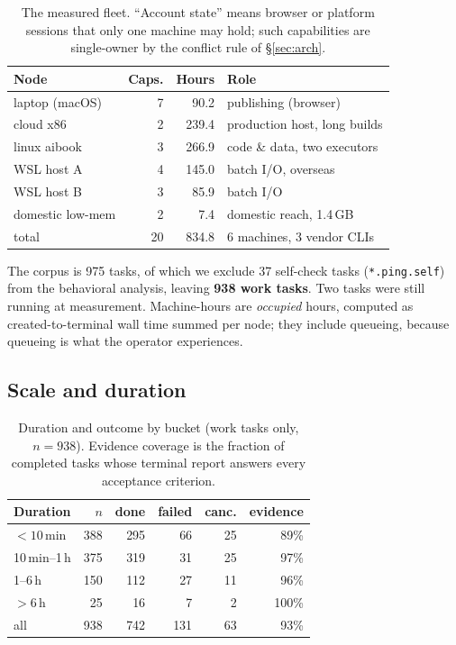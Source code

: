 \documentclass{article}
\begin{document}
\begin{table}[t]
\centering\small
\caption{The measured fleet. ``Account state'' means browser or platform sessions
that only one machine may hold; such capabilities are single-owner by the conflict
rule of \S\ref{sec:arch}.}
\label{tab:fleet}
\setlength{\tabcolsep}{3.2pt}
\begin{tabular}{@{}lrrp{}@{}}
\toprule
Node & Caps. & Hours & Role \\
\midrule
laptop (macOS)   & 7 &  90.2 & publishing (browser) \\
cloud x86        & 2 & 239.4 & production host, long builds \\
linux aibook     & 3 & 266.9 & code \& data, two executors \\
WSL host A       & 4 & 145.0 & batch I/O, overseas \\
WSL host B       & 3 &  85.9 & batch I/O \\
domestic low-mem & 2 &   7.4 & domestic reach, 1.4\,GB \\
\midrule
total            & 20 & 834.8 & 6 machines, 3 vendor CLIs \\
\bottomrule
\end{tabular}
\end{table}

The corpus is 975 tasks, of which we exclude 37 self-check tasks
(\texttt{*.ping.self}) from the behavioral analysis, leaving \textbf{938 work
tasks}. Two tasks were still running at measurement. Machine-hours are
\emph{occupied} hours, computed as created-to-terminal wall time summed per node; they
include queueing, because queueing is what the operator experiences.

\subsection{Scale and duration}

\begin{table}[t]
\centering\small
\caption{Duration and outcome by bucket (work tasks only, $n=938$). Evidence
coverage is the fraction of completed tasks whose terminal report answers every
acceptance criterion.}
\label{tab:dur}
\begin{tabular}{@{}lrrrrr@{}}
\toprule
Duration & $n$ & done & failed & canc. & evidence \\
\midrule
$<10$\,min   & 388 & 295 & 66 & 25 & 89\% \\
10\,min--1\,h & 375 & 319 & 31 & 25 & 97\% \\
1--6\,h      & 150 & 112 & 27 & 11 & 96\% \\
$>6$\,h      &  25 &  16 &  7 &  2 & 100\% \\
\midrule
all          & 938 & 742 & 131 & 63 & 93\% \\
\bottomrule
\end{tabular}
\end{table}
\end{document}
